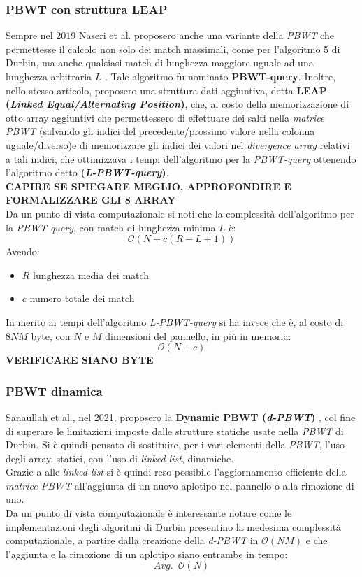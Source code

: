 \subsubsection{PBWT con struttura LEAP}
Sempre nel 2019 Naseri et al. proposero anche una variante della \textit{PBWT}
che permettesse il calcolo non solo dei match massimali, come per l'algoritmo 5
di Durbin, ma anche qualsiasi match di lunghezza maggiore uguale ad una
lunghezza arbitraria $L$ \cite{leap}. Tale algoritmo fu nominato
\textbf{PBWT-query}. Inoltre, nello 
stesso articolo, proposero 
una struttura dati aggiuntiva, detta \textbf{LEAP (\textit{Linked
    Equal/Alternating Position})}, che, al costo della 
memorizzazione di otto array aggiuntivi che permettessero di effettuare dei
salti nella \textit{matrice PBWT} (salvando gli indici del precedente/prossimo
valore nella colonna uguale/diverso)e di memorizzare gli indici dei valori
nel \textit{divergence array} relativi a tali indici, che ottimizzava i tempi
dell'algoritmo per la \textit{PBWT-query} ottenendo l'algoritmo detto
\textbf{(\textit{L-PBWT-query})}.\\ 
\textbf{CAPIRE SE SPIEGARE MEGLIO, APPROFONDIRE E FORMALIZZARE GLI 8 ARRAY}\\
Da un punto di vista computazionale si noti che la complessità dell'algoritmo
per la \textit{\textit{PBWT query}}, con match di lunghezza minima $L$ è:
\[\mathcal{O}(N+c(R-L+1))\]
Avendo:
\begin{itemize}
  \item $R$ lunghezza media dei match
  \item $c$ numero totale dei match
\end{itemize}
In merito ai tempi dell'algoritmo \textit{L-PBWT-query} si ha invece che è, al
costo di $8NM$ byte, con $N$ e $M$ dimensioni del pannello, in più in memoria:
\[\mathcal{O}(N+c)\]
\textbf{VERIFICARE SIANO BYTE}
\subsubsection{PBWT dinamica}
Sanaullah et al., nel 2021, proposero la \textbf{Dynamic PBWT (\textit{d-PBWT})}
\cite{dpbwt}, col fine di superare le limitazioni imposte dalle strutture
statiche usate nella \textit{PBWT} di Durbin. Si è quindi pensato di sostituire,
per i vari elementi della \textit{PBWT}, l'uso degli array, statici, con l'uso
di \textit{linked list}, dinamiche.\\
Grazie a alle \textit{linked list} si è quindi reso possibile l'aggiornamento
efficiente della \textit{matrice PBWT} all'aggiunta di un nuovo aplotipo nel
pannello o alla rimozione di uno.\\
Da un punto di vista computazionale è interessante notare come le
implementazioni degli algoritmi di Durbin presentino la medesima complessità
computazionale, a partire dalla creazione della \textit{d-PBWT} in
$\mathcal{O}(NM)$ e che l'aggiunta e la rimozione di un aplotipo siano entrambe
in tempo:
\[Avg.\,\,\,\mathcal{O}(N)\]
